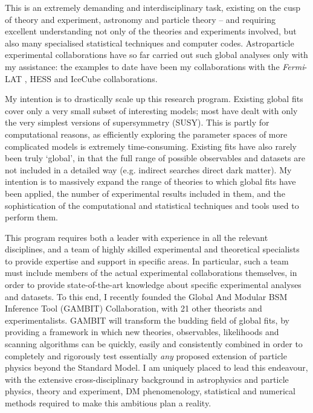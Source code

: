 \documentclass[a4paper,11pt]{article}
\begin{document}
This is an extremely demanding and interdisciplinary task, existing on the cusp of theory and experiment, astronomy and particle theory -- and requiring excellent understanding not only of the theories and experiments involved, but also many specialised statistical techniques and computer codes.  Astroparticle experimental collaborations have so far carried out such global analyses only with my assistance: the examples to date have been my collaborations with the \textit{Fermi}-LAT \cite{Scott09c}, HESS \cite{Ripken11} and IceCube \cite{IC22Methods} collaborations.  

My intention is to drastically scale up this research program.  Existing global fits \cite{Baltz04, Sfitter, Fittino, Ruiz06, Allanach06, Trotta08, Scott09c, Buchmueller09, Akrami09, AbdusSalam09a, AbdusSalam09b, Ripken11, Allanach11a, Allanach11b, Mastercode11, MastercodeXENON100, MastercodeHiggs, SuperbayesXENON100, Arina11, Pato11, BertoneLHCDD, Fittino12, Mastercode12, Mastercode12b, Roszkowski12, Strege13} cover only a very small subset of interesting models; most have dealt with only the very simplest versions of supersymmetry (SUSY).  This is partly for computational reasons, as efficiently exploring the parameter spaces of more complicated models is extremely time-consuming.  Existing fits have also rarely been truly `global', in that the full range of possible observables and datasets are not included in a detailed way (e.g. indirect searches direct dark matter).  My intention is to massively expand the range of theories to which global fits have been applied, the number of experimental results included in them, and the sophistication of the computational and statistical techniques and tools used to perform them.

This program requires both a leader with experience in all the relevant disciplines, and a team of highly skilled experimental and theoretical specialists to provide expertise and support in specific areas.  In particular, such a team must include members of the actual experimental collaborations themselves, in order to provide state-of-the-art knowledge about specific experimental analyses and datasets.  To this end, I recently founded the Global And Modular BSM Inference Tool (GAMBIT) Collaboration, with 21 other theorists and experimentalists.  GAMBIT will transform the budding field of global fits, by providing a framework in which new theories, observables, likelihoods and scanning algorithms can be quickly, easily and consistently combined in order to completely and rigorously test essentially \textit{any} proposed extension of particle physics beyond the Standard Model.  I am uniquely placed to lead this endeavour, with the extensive cross-disciplinary background in astrophysics and particle physics, theory and experiment, DM phenomenology, statistical and numerical methods required to make this ambitious plan a reality.  
\end{document}
